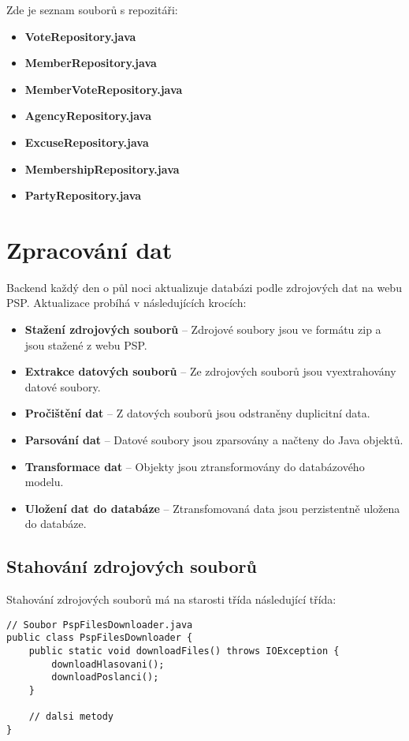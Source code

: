 \noindent Zde je seznam souborů s repozitáři:

\begin{itemize}
	\item \textbf{VoteRepository.java}
	\item \textbf{MemberRepository.java}
	\item \textbf{MemberVoteRepository.java}
	\item \textbf{AgencyRepository.java}
	\item \textbf{ExcuseRepository.java}
	\item \textbf{MembershipRepository.java}
	\item \textbf{PartyRepository.java}
\end{itemize}

\section{Zpracování dat}
Backend každý den o půl noci aktualizuje databázi podle zdrojových dat na webu PSP. Aktualizace probíhá v následujících krocích:

\begin{itemize}
	\item \textbf{Stažení zdrojových souborů} -- Zdrojové soubory jsou ve formátu zip a jsou stažené z webu PSP.
	\item \textbf{Extrakce datových souborů} -- Ze zdrojových souborů jsou vyextrahovány datové soubory.
	\item \textbf{Pročištění dat} -- Z datových souborů jsou odstraněny duplicitní data.
	\item \textbf{Parsování dat} -- Datové soubory jsou zparsovány a načteny do Java objektů.
	\item \textbf{Transformace dat} --  Objekty jsou ztransformovány do databázového modelu.
	\item \textbf{Uložení dat do databáze} -- Ztransfomovaná data jsou perzistentně uložena do databáze.
\end{itemize}

\subsection*{Stahování zdrojových souborů}
Stahování zdrojových souborů má na starosti třída následující třída:

\begin{lstlisting}[caption={Třída pro stahování zdrojových souborů}, label={lst:psp-downloader}, tabsize=2]
// Soubor PspFilesDownloader.java
public class PspFilesDownloader {
	public static void downloadFiles() throws IOException {
		downloadHlasovani();
		downloadPoslanci();
	}

	// dalsi metody
}
\end{lstlisting}

